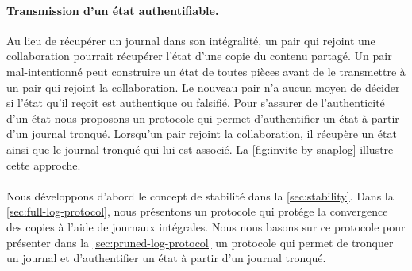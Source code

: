 \paragraph{Transmission d'un état authentifiable.} Au lieu de récupérer un journal dans son intégralité, un pair qui rejoint une collaboration pourrait récupérer l'état d'une copie du contenu partagé.
Un pair mal-intentionné peut construire un état de toutes pièces avant de le transmettre à un pair qui rejoint la collaboration.
Le nouveau pair n'a aucun moyen de décider si l'état qu'il reçoit est authentique ou falsifié.
Pour s'assurer de l'authenticité d'un état nous proposons un protocole qui permet d'authentifier un état à partir d'un journal tronqué.
Lorsqu'un pair rejoint la collaboration, il récupère un état ainsi que le journal tronqué qui lui est associé.
La \autoref{fig:invite-by-snaplog} illustre cette approche.

\paragraph{} Nous développons d'abord le concept de stabilité dans la \autoref{sec:stability}.
Dans la \autoref{sec:full-log-protocol}, nous présentons un protocole qui protége la convergence des copies à l'aide de journaux intégrales.
Nous nous basons sur ce protocole pour présenter dans la \autoref{sec:pruned-log-protocol} un protocole qui permet de tronquer un journal et d'authentifier un état à partir d'un journal tronqué.

